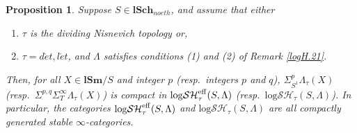 \documentclass[11pt, a4paper]{amsart}
\newtheorem{prop}[thm]{Proposition}
\theoremstyle{definition}
\numberwithin{equation}{subsection}
\newcommand{\lSch}{\mathbf{lSch}}
\newcommand{\lSm}{\mathbf{lSm}}
\newcommand{\et}{{\acute{e}t}}
\newcommand{\eff}{{\rm eff}}
\newcommand{\inflogSH}{\mathrm{log}\mathcal{SH}}
\begin{document}
\begin{prop}
\label{logH.31}
Suppose $S\in \lSch_{noeth}$, and assume that either
\begin{enumerate}
    \item $\tau$ is  the dividing Nisnevich topology or,
    \item $\tau = d\et , l\et$, and $\Lambda$ satisfies conditions (1) and (2) of Remark \ref{logH.21}. 
\end{enumerate}
Then, for all $X\in \lSm/S$ and integer $p$ (resp.\ integers $p$ and $q$), $\Sigma_{S^1}^p  \Lambda_\tau(X)$ (resp.\ $\Sigma^{p,q}\Sigma_T^\infty \Lambda_\tau(X)$) is compact in $\inflogSH_{\tau}^\eff(S, 
\Lambda)$ (resp.\ $\inflogSH_\tau(S, \Lambda)$). In particular, the categories $\inflogSH^\eff_{\tau}(S, \Lambda)$ and $\inflogSH_\tau(S, \Lambda)$ are all compactly generated stable $\infty$-categories.
\end{prop}
\end{document}
